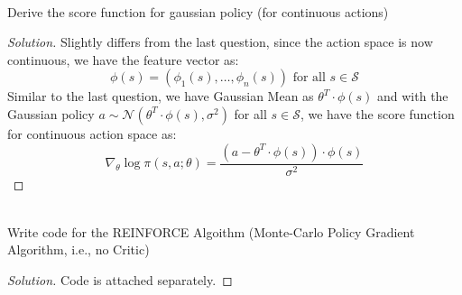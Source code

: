 \documentclass[12pt]{article}
\newenvironment{problem}[2][Problem]{\begin{trivlist}
\item[\hskip \labelsep {\bfseries #1}\hskip \labelsep {\bfseries #2.}]}{\end{trivlist}}
\newenvironment{solution}
  {\renewcommand\qedsymbol{$\blacksquare$}\begin{proof}[Solution]}
  {\end{proof}}
\begin{document}
\begin{problem}{3}
	\text{ }\\
	Derive the score function for gaussian policy (for continuous actions)
\end{problem}
\begin{solution}
	Slightly differs from the last question, since the action space is now continuous, we have the feature vector as:
	\begin{equation}
	\phi(s)=\left(\phi_{1}(s), \ldots, \phi_{n}(s)\right) \text { for all } s \in \mathcal{S}
	\end{equation}
	Similar to the last question, we have Gaussian Mean as $\theta^T\cdot\phi(s)$ and with the Gaussian policy $a \sim \mathcal{N}\left(\theta^{T} \cdot \phi(s), \sigma^{2}\right)$ for all $s \in \mathcal{S}$, we have the score function for continuous action space as:
	\begin{equation}
		\nabla_{\theta} \log \pi(s, a ; \theta)=\frac{\left(a-\theta^{T} \cdot \phi(s)\right) \cdot \phi(s)}{\sigma^{2}}
	\end{equation}	
\end{solution}

\begin{problem}{4}
	\text{ }\\
	Write code for the REINFORCE Algoithm (Monte-Carlo Policy Gradient Algorithm, i.e., no Critic)
\end{problem}
\begin{solution}
	Code is attached separately.
\end{solution}
\end{document}
